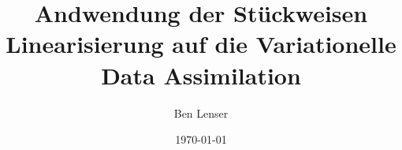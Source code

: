 \documentclass[
	12pt,
	a4paper,
	twoside,
	titlepage,
	parskip=half,
	BCOR=10mm,
	bibliography=totoc,
	headings=normal,
	DIV=calc,
 	draft
]{scrreprt}
\begin{document}
\author{Ben Lenser}
\title{Andwendung der Stückweisen Linearisierung auf die Variationelle Data Assimilation}
\date{\today}

  

\cleardoublepage
{}










\begin{spacing}{1}
 \printbibliography
\end{spacing}

\appendix




\end{document}
